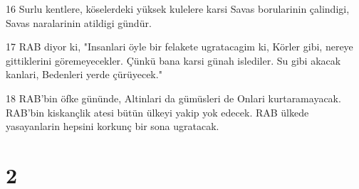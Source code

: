 \par 16 Surlu kentlere, köselerdeki yüksek kulelere karsi Savas borularinin çalindigi, Savas naralarinin atildigi gündür.
\par 17 RAB diyor ki, "Insanlari öyle bir felakete ugratacagim ki, Körler gibi, nereye gittiklerini göremeyecekler. Çünkü bana karsi günah islediler. Su gibi akacak kanlari, Bedenleri yerde çürüyecek."
\par 18 RAB'bin öfke gününde, Altinlari da gümüsleri de Onlari kurtaramayacak. RAB'bin kiskançlik atesi bütün ülkeyi yakip yok edecek. RAB ülkede yasayanlarin hepsini korkunç bir sona ugratacak.

\chapter{2}

